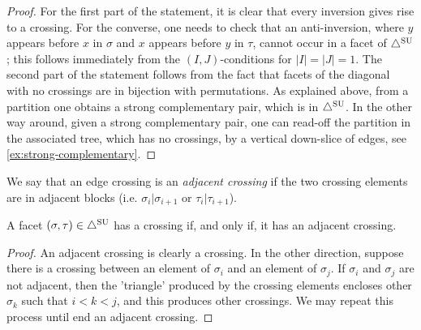 \begin{proof}
For the first part of the statement, it is clear that every inversion gives rise to a crossing. 
For the converse, one needs to check that an anti-inversion, where $y$ appears before $x$ in $\sigma$ and $x$ appears before $y$ in $\tau$, cannot occur in a facet of $\triangle^{\mathrm{SU}}$; this follows immediately from the $(I,J)$-conditions for $|I|=|J|=1$. 
The second part of the statement follows from the fact that facets of the diagonal with no crossings are in bijection with permutations.
As explained above, from a partition one obtains a strong complementary pair, which is in $\triangle^{\mathrm{SU}}$. 
In the other way around, given a strong complementary pair, one can read-off the partition in the associated tree, which has no crossings, by a vertical down-slice of edges, see \cref{ex:strong-complementary}.
\end{proof}
We say that an edge crossing is an \emph{adjacent crossing} if the two crossing elements are in adjacent blocks (i.e. $\sigma_i|\sigma_{i+1}$ or $\tau_i|\tau_{i+1}$).
\begin{lemma}
A facet $(\sigma,\tau) \in \triangle^{\mathrm{SU}}$ has a crossing if, and only if, it has an adjacent crossing.
\end{lemma}
\begin{proof}
An adjacent crossing is clearly a crossing. In the other direction, suppose there is a crossing between an element of $\sigma_i$ and an element of $\sigma_j$. If $\sigma_i$ and $\sigma_j$ are not adjacent, then the 'triangle' produced by the crossing elements encloses other $\sigma_k$ such that $i<k<j$, and this produces other crossings. We may repeat this process until end an adjacent crossing.
\end{proof}

